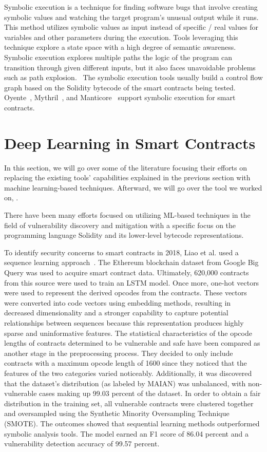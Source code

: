 Symbolic execution is a technique for finding software bugs that involve creating symbolic values and watching the target program's unusual output while it runs.
This method utilizes symbolic values as input instead of specific / real values for variables and other parameters during the execution.
Tools leveraging this technique explore a state space with a high degree of semantic awareness.~\cite{boyer1975select}
Symbolic execution explores multiple paths the logic of the program can transition through given different inputs, but it also faces unavoidable problems such as path explosion.~\cite{baldoni2018survey}
The symbolic execution tools usually build a control flow graph based on the Solidity bytecode of the smart contracts being tested.
Oyente~\cite{oyente}, Mythril~\cite{mythril}, and Manticore~\cite{mossberg2019manticore} support symbolic execution for smart contracts.


\section{Deep Learning in Smart Contracts} \label{sec:dl-models}

In this section, we will go over some of the literature focusing their efforts on replacing the existing tools' capabilities explained in the previous section with machine learning-based techniques.
Afterward, we will go over the tool we worked on, \slithersimil.

There have been many efforts focused on utilizing ML-based techniques in the field of vulnerability discovery and mitigation with a specific focus on the programming language Solidity and
its lower-level bytecode representations.

To identify security concerns to smart contracts in 2018, Liao et al. used a sequence learning approach~\cite{madmax}.
The Ethereum blockchain dataset from Google Big Query was used to acquire smart contract data.
Ultimately, 620,000 contracts from this source were used to train an LSTM model. Once more, one-hot vectors were used to represent the derived opcodes from the contracts.
These vectors were converted into code vectors using embedding methods, resulting in decreased dimensionality and a stronger capability to capture potential relationships between sequences because this representation produces highly sparse and uninformative features.
The statistical characteristics of the opcode lengths of contracts determined to be vulnerable and safe have been compared as another stage in the preprocessing process.
They decided to only include contracts with a maximum opcode length of 1600 since they noticed that the features of the two categories varied noticeably.
Additionally, it was discovered that the dataset's distribution (as labeled by MAIAN) was unbalanced, with non-vulnerable cases making up 99.03 percent of the dataset.
In order to obtain a fair distribution in the training set, all vulnerable contracts were clustered together and oversampled using the Synthetic Minority Oversampling Technique (SMOTE).
The outcomes showed that sequential learning methods outperformed symbolic analysis tools.
The model earned an F1 score of 86.04 percent and a vulnerability detection accuracy of 99.57 percent.

